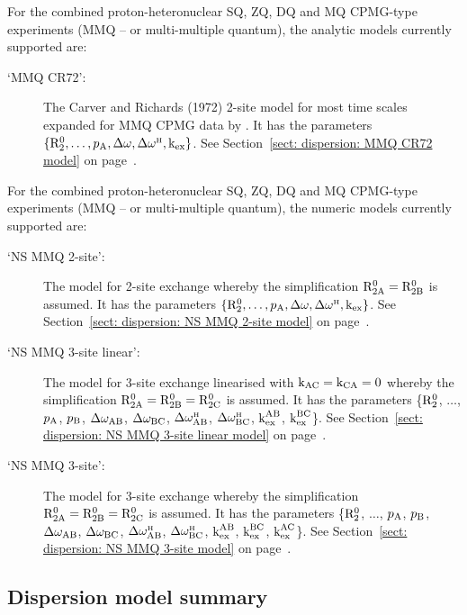 For the combined proton-heteronuclear SQ, ZQ, DQ and MQ CPMG-type experiments (MMQ -- or multi-multiple quantum), the analytic models currently supported are:

\begin{description}
\item[`MMQ CR72':]  The Carver and Richards (1972) 2-site model for most time scales expanded for MMQ CPMG data by \citet{Korzhnev04a}.  It has the parameters $\{\mathrm{R}_2^0, \dots, p_\textrm{A}, \Delta\omega, \Delta\omega^{\scriptscriptstyle\mathrm{H}}, \textrm{k}_\textrm{ex}\}$.  See Section~\ref{sect: dispersion: MMQ CR72 model} on page~\pageref{sect: dispersion: MMQ CR72 model}.
\end{description}


For the combined proton-heteronuclear SQ, ZQ, DQ and MQ CPMG-type experiments (MMQ -- or multi-multiple quantum), the numeric models currently supported are:

\begin{description}
\item[`NS MMQ 2-site':]  The model for 2-site exchange whereby the simplification $\mathrm{R}_\mathrm{2A}^0 = \mathrm{R}_\mathrm{2B}^0$ is assumed.  It has the parameters $\{\mathrm{R}_2^0, \dots, p_\textrm{A}, \Delta\omega, \Delta\omega^{\scriptscriptstyle\mathrm{H}}, \textrm{k}_\textrm{ex}\}$.  See Section~\ref{sect: dispersion: NS MMQ 2-site model} on page~\pageref{sect: dispersion: NS MMQ 2-site model}.
\item[`NS MMQ 3-site linear':]  The model for 3-site exchange linearised with $\textrm{k}_\textrm{AC}=\textrm{k}_\textrm{CA}=0$ whereby the simplification $\mathrm{R}_\mathrm{2A}^0 = \mathrm{R}_\mathrm{2B}^0 = \mathrm{R}_\mathrm{2C}^0$ is assumed.  It has the parameters \{$\mathrm{R}_2^0$, $\dots$, $p_\textrm{A}$, $p_\textrm{B}$, $\Delta\omega_\textrm{AB}$, $\Delta\omega_\textrm{BC}$, $\Delta\omega^{\scriptscriptstyle\mathrm{H}}_\textrm{AB}$, $\Delta\omega^{\scriptscriptstyle\mathrm{H}}_\textrm{BC}$, $\textrm{k}_\textrm{ex}^\textrm{AB}$, $\textrm{k}_\textrm{ex}^\textrm{BC}$\}.  See Section~\ref{sect: dispersion: NS MMQ 3-site linear model} on page~\pageref{sect: dispersion: NS MMQ 3-site linear model}.
\item[`NS MMQ 3-site':]  The model for 3-site exchange whereby the simplification $\mathrm{R}_\mathrm{2A}^0 = \mathrm{R}_\mathrm{2B}^0 = \mathrm{R}_\mathrm{2C}^0$ is assumed.  It has the parameters \{$\mathrm{R}_2^0$, $\dots$, $p_\textrm{A}$, $p_\textrm{B}$, $\Delta\omega_\textrm{AB}$, $\Delta\omega_\textrm{BC}$, $\Delta\omega^{\scriptscriptstyle\mathrm{H}}_\textrm{AB}$, $\Delta\omega^{\scriptscriptstyle\mathrm{H}}_\textrm{BC}$, $\textrm{k}_\textrm{ex}^\textrm{AB}$, $\textrm{k}_\textrm{ex}^\textrm{BC}$, $\textrm{k}_\textrm{ex}^\textrm{AC}$\}.  See Section~\ref{sect: dispersion: NS MMQ 3-site model} on page~\pageref{sect: dispersion: NS MMQ 3-site model}.
\end{description}



\subsection{Dispersion model summary}

